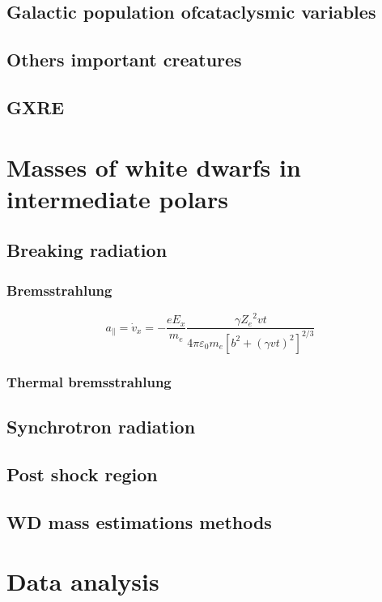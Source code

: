 \documentclass[oneside,a4paper,11pt]{report}
\begin{document}
\section{Galactic population ofcataclysmic variables }
\section{Others important creatures}
\section{GXRE}



\chapter{Masses of white dwarfs in intermediate polars}
\section{Breaking radiation}
\subsection{Bremsstrahlung}
\begin{equation}
 a_{\parallel} = \dot{v}_x = -\frac{eE_x}{m_e}\frac{\gamma {Z_e}^2 vt}{4\pi \varepsilon_0 m_e \left [ b^2 + \left ( \gamma vt \right )^2  \right ]^{2/3}} 
\end{equation}

\subsection{Thermal bremsstrahlung}



\section{Synchrotron radiation}
\section{Post shock region}
\section{WD mass estimations methods}

\chapter{Data analysis}
\end{document}

